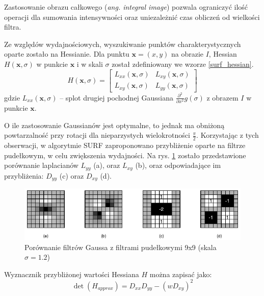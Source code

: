 Zastosowanie obrazu całkowego (\emph{ang. integral image}) pozwala ograniczyć ilość operacji dla sumowania intensywności oraz uniezależnić czas obliczeń od wielkości filtra.\cite{BAY08}

Ze względów wydajnościowych, wyszukiwanie punktów charakterystycznych oparte zostało na Hessianie. Dla punktu $\boldsymbol{x}=(x, y)$ na obrazie $I$, Hessian $H(\boldsymbol{x}, \sigma)$ w punkcie $\boldsymbol{x}$ i w skali $\sigma$ został zdefiniowany we wzorze \ref{surf_hessian}.
\begin{equation} 
\label{surf_hessian} 
H(\boldsymbol{x}, \sigma) = 
	\begin{bmatrix}
		L_{xx}(\boldsymbol{x}, \sigma) & L_{xy}(\boldsymbol{x}, \sigma) \\
		L_{xy}(\boldsymbol{x}, \sigma) & L_{yy}(\boldsymbol{x}, \sigma)
	\end{bmatrix}
\end{equation} gdzie $L_{xx}(\boldsymbol{x}, \sigma)$ -- splot drugiej pochodnej Gaussiana $\frac{\partial^2}{\partial x^2} g(\sigma)$ z obrazem $I$ w punkcie $\boldsymbol{x}$.

O ile zastosowanie Gaussianów jest optymalne\cite{LINDENBERG90}, to jednak ma obniżoną powtarzalność przy rotacji dla nieparzystych wielokrotności $\frac{\pi}{2}$. Korzystając z tych obserwacji, w algorytmie SURF zaproponowano przybliżenie oparte na filtrze pudełkowym, w celu zwiększenia wydajności. Na rys. \ref{fig:surf-box-filters} zostało przedstawione porównanie laplacianów $L_{yy}$ (a), oraz $L_{xy}$ (b), oraz odpowiadające im przybliżenia: $D_{yy}$ (c) oraz $D_{xy}$ (d).

\begin{figure}[h]
	\centering
	\includegraphics[scale=1.7]{graphics/01_podstawy_teoretyczne/surf-box-filters.pdf}
	\caption{Porównanie filtrów Gaussa z filtrami pudełkowymi 9x9 (skala $\sigma = 1.2$) \cite{BAY08}}
	\label{fig:surf-box-filters}
\end{figure}

Wyznacznik przybliżonej wartości Hessiana $H$ można zapisać jako:
\begin{equation} 
\label{surf_hessian_det}
\det(H_{approx}) = D_{xx} D_{yy} - (w D_{xy})^2
\end{equation}

